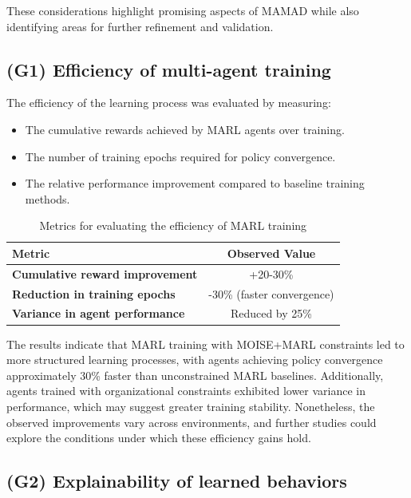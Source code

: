 \documentclass[pdflatex,sn-mathphys-num]{sn-jnl}%
\theoremstyle{thmstyleone}%
\theoremstyle{thmstyletwo}%
\theoremstyle{thmstylethree}%
\begin{document}
These considerations highlight promising aspects of MAMAD while also identifying areas for further refinement and validation.


\subsection{(G1) Efficiency of multi-agent training}

The efficiency of the learning process was evaluated by measuring:
\begin{itemize}
    \item The cumulative rewards achieved by MARL agents over training.
    \item The number of training epochs required for policy convergence.
    \item The relative performance improvement compared to baseline training methods.
\end{itemize}

\begin{table}[h!]
    \centering
    \caption{Metrics for evaluating the efficiency of MARL training}
    \begin{tabular}{|l|c|}
        \hline
        \textbf{Metric} & \textbf{Observed Value} \\
        \hline
        \textbf{Cumulative reward improvement} & +20-30\% \\
        \hline
        \textbf{Reduction in training epochs} & -30\% (faster convergence) \\
        \hline
        \textbf{Variance in agent performance} & Reduced by 25\% \\
        \hline
    \end{tabular}
    \label{tab:efficiency}
\end{table}

The results indicate that MARL training with MOISE+MARL constraints led to more structured learning processes, with agents achieving policy convergence approximately 30\% faster than unconstrained MARL baselines. Additionally, agents trained with organizational constraints exhibited lower variance in performance, which may suggest greater training stability. Nonetheless, the observed improvements vary across environments, and further studies could explore the conditions under which these efficiency gains hold.

\subsection{(G2) Explainability of learned behaviors}
\end{document}
